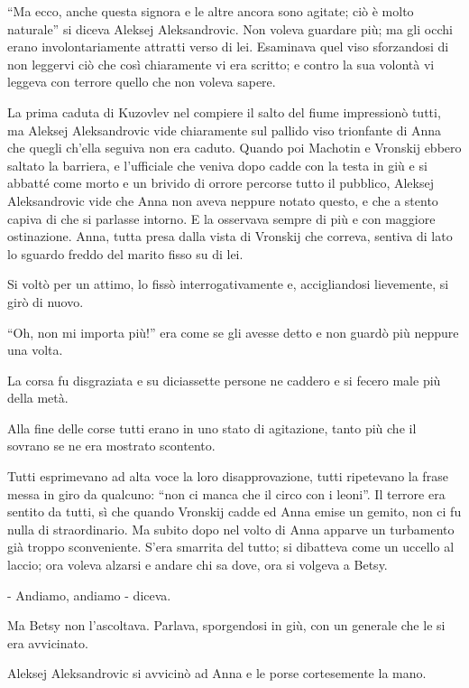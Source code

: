 ``Ma ecco, anche questa signora e le altre ancora sono agitate; ciò è molto naturale'' si diceva Aleksej Aleksandrovic. Non voleva guardare più; ma gli occhi erano involontariamente attratti verso di lei. Esaminava quel viso sforzandosi di non leggervi ciò che così chiaramente vi era scritto; e contro la sua volontà vi leggeva con terrore quello che non voleva sapere. 

La prima caduta di Kuzovlev nel compiere il salto del fiume impressionò tutti, ma Aleksej Aleksandrovic vide chiaramente sul pallido viso trionfante di Anna che quegli ch'ella seguiva non era caduto. Quando poi Machotin e Vronskij ebbero saltato la barriera, e l'ufficiale che veniva dopo cadde con la testa in giù e si abbatté come morto e un brivido di orrore percorse tutto il pubblico, Aleksej Aleksandrovic vide che Anna non aveva neppure notato questo, e che a stento capiva di che si parlasse intorno. E la osservava sempre di più e con maggiore ostinazione. Anna, tutta presa dalla vista di Vronskij che correva, sentiva di lato lo sguardo freddo del marito fisso su di lei. 

Si voltò per un attimo, lo fissò interrogativamente e, accigliandosi lievemente, si girò di nuovo. 

``Oh, non mi importa più!'' era come se gli avesse detto e non guardò più neppure una volta. 

La corsa fu disgraziata e su diciassette persone ne caddero e si fecero male più della metà. 

Alla fine delle corse tutti erano in uno stato di agitazione, tanto più che il sovrano se ne era mostrato scontento. 

\label{xxix-1} 

Tutti esprimevano ad alta voce la loro disapprovazione, tutti ripetevano la frase messa in giro da qualcuno: ``non ci manca che il circo con i leoni''. Il terrore era sentito da tutti, sì che quando Vronskij cadde ed Anna emise un gemito, non ci fu nulla di straordinario. Ma subito dopo nel volto di Anna apparve un turbamento già troppo sconveniente. S'era smarrita del tutto; si dibatteva come un uccello al laccio; ora voleva alzarsi e andare chi sa dove, ora si volgeva a Betsy. 

- Andiamo, andiamo - diceva. 

Ma Betsy non l'ascoltava. Parlava, sporgendosi in giù, con un generale che le si era avvicinato. 

Aleksej Aleksandrovic si avvicinò ad Anna e le porse cortesemente la mano. 

